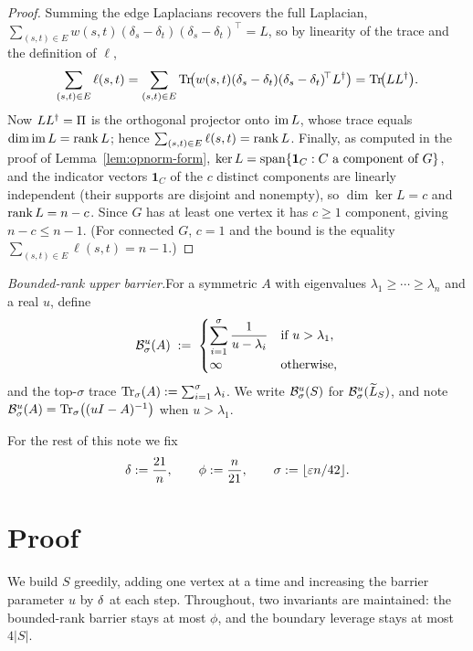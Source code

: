 \begin{proof}
Summing the edge Laplacians recovers the full Laplacian,
$\sum_{(s,t)\in E}w(s,t)(\delta_s-\delta_t)(\delta_s-\delta_t)^{\!\top}=L$, so by
linearity of the trace and the definition of $\ell$,
\[
  \sum_{(s,t)\in E}\ell(s,t)
   =\sum_{(s,t)\in E}\operatorname{Tr}\!\bigl(w(s,t)(\delta_s-\delta_t)(\delta_s-\delta_t)^{\!\top}L^{\dagger}\bigr)
   =\operatorname{Tr}\!\bigl(LL^{\dagger}\bigr).
\]
Now $LL^{\dagger}=\Pi$ is the orthogonal projector onto $\operatorname{im} L$, whose trace equals
$\dim\operatorname{im} L=\operatorname{rank} L$; hence $\sum_{(s,t)\in E}\ell(s,t)=\operatorname{rank} L$.
Finally, as computed in the proof of Lemma~\ref{lem:opnorm-form},
$\ker L=\operatorname{span}\{\mathbf 1_C:C\text{ a component of }G\}$, and the indicator
vectors $\mathbf 1_C$ of the $c$ distinct components are linearly independent
(their supports are disjoint and nonempty), so $\dim\ker L=c$ and
$\operatorname{rank} L=n-c$. Since $G$ has at least one vertex it has $c\ge 1$ component,
giving $n-c\le n-1$. (For connected $G$, $c=1$ and the bound is the equality
$\sum_{(s,t)\in E}\ell(s,t)=n-1$.)
\end{proof}

\medskip
\noindent\emph{Bounded-rank upper barrier.}\quad For a symmetric $A$ with
eigenvalues $\lambda_1\ge\cdots\ge\lambda_n$ and a real $u$, define
\[
  \mathcal{B}^{u}_{\sigma}(A) \;:=\;
  \begin{cases}
    \displaystyle\sum_{i=1}^{\sigma}\dfrac{1}{u-\lambda_i} & \text{if } u>\lambda_1,\\[2pt]
    \infty & \text{otherwise,}
  \end{cases}
\]
and the top-$\sigma$ trace $\operatorname{Tr}_{\sigma}(A):=\sum_{i=1}^{\sigma}\lambda_i$. We write
$\mathcal{B}^{u}_{\sigma}(S)$ for $\mathcal{B}^{u}_{\sigma}(\widetilde{L}_S)$, and note
$\mathcal{B}^{u}_{\sigma}(A)=\operatorname{Tr}_{\sigma}\bigl((uI-A)^{-1}\bigr)$ when $u>\lambda_1$.

For the rest of this note we fix
\[
  \delta := \frac{21}{n}, \qquad
  \phi := \frac{n}{21}, \qquad
  \sigma := \lfloor \varepsilon n/42 \rfloor.
\]

\section*{Proof}

We build $S$ greedily, adding one vertex at a time and increasing the barrier
parameter $u$ by $\delta$ at each step. Throughout, two invariants are
maintained: the bounded-rank barrier stays at most $\phi$, and the boundary
leverage stays at most $4|S|$.

